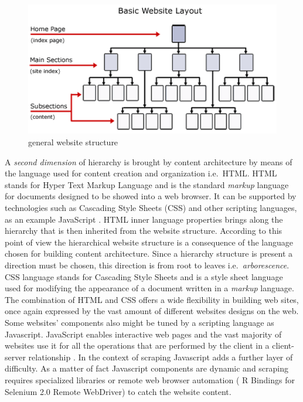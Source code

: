 \documentclass[
  12pt,
  a4paper,
  oneside]{book}
\theoremstyle{definition}
\theoremstyle{definition}
\theoremstyle{definition}
\theoremstyle{remark}
\begin{document}
\begin{figure}
\centering
\includegraphics{images/content-vs-html-title.png}
\caption{general website structure}
\end{figure}

A \emph{second dimension} of hierarchy is brought by content architecture by means of the language used for content creation and organization i.e.~HTML. HTML stands for Hyper Text Markup Language and is the standard \emph{markup} language for documents designed to be showed into a web browser. It can be supported by technologies such as Cascading Style Sheets (CSS) and other scripting languages, as an example JavaScript \citep{html_2020}.
HTML inner language properties brings along the hierarchy that is then inherited from the website structure. According to this point of view the hierarchical website structure is a consequence of the language chosen for building content architecture.
Since a hierarchy structure is present a direction must be chosen, this direction is from root to leaves i.e.~\emph{arborescence}.
CSS language stands for Cascading Style Sheets and is a style sheet language used for modifying the appearance of a document written in a \emph{markup} language\citep{css_2020}.
The combination of HTML and CSS offers a wide flexibility in building web sites, once again expressed by the vast amount of different websites designs on the web. Some websites' components also might be tuned by a scripting language as Javascript. JavaScript enables interactive web pages and the vast majority of websites use it for all the operations that are performed by the client in a client-server relationship \citep{Javascript_2020}.
In the context of scraping Javascript adds a further layer of difficulty. As a matter of fact Javascript components are dynamic and scraping requires specialized libraries or remote web browser automation (\citep{RSelenium} R Bindings for Selenium 2.0 Remote WebDriver) to catch the website content.
\end{document}
